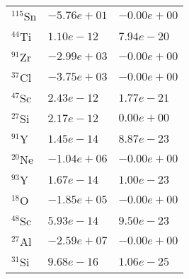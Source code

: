 \begin{tabular}{lll}
 $^{115}$Sn & $-5.76e+01 $                                                       & $-0.00e+00 $                                                                    \\
 $^{44}$Ti  & $1.10e-12 $                                                        & $7.94e-20 $                                                                     \\
 $^{91}$Zr  & $-2.99e+03 $                                                       & $-0.00e+00 $                                                                    \\
 $^{37}$Cl  & $-3.75e+03 $                                                       & $-0.00e+00 $                                                                    \\
 $^{47}$Sc  & $2.43e-12 $                                                        & $1.77e-21 $                                                                     \\
 $^{27}$Si  & $2.17e-12 $                                                        & $0.00e+00 $                                                                     \\
 $^{91}$Y   & $1.45e-14 $                                                        & $8.87e-23 $                                                                     \\
 $^{20}$Ne  & $-1.04e+06 $                                                       & $-0.00e+00 $                                                                    \\
 $^{93}$Y   & $1.67e-14 $                                                        & $1.00e-23 $                                                                     \\
 $^{18}$O   & $-1.85e+05 $                                                       & $-0.00e+00 $                                                                    \\
 $^{48}$Sc  & $5.93e-14 $                                                        & $9.50e-23 $                                                                     \\
 $^{27}$Al  & $-2.59e+07 $                                                       & $-0.00e+00 $                                                                    \\
 $^{31}$Si  & $9.68e-16 $                                                        & $1.06e-25 $                                                                     \\

\end{tabular}
